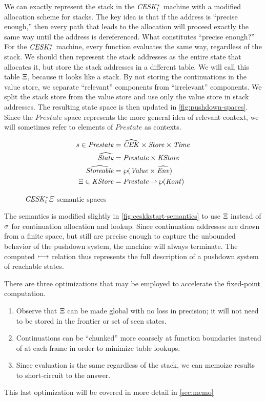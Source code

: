 We can exactly represent the stack in the $\mathit{CESK^*_t}$ machine with a modified allocation scheme for stacks.
%
The key idea is that if the address is ``precise enough,'' then every path that leads to the allocation will proceed exactly the same way until the address is dereferenced.
%
What constitutes ``precise enough?'' 
%
For the $\mathit{CESK^*_t}$ machine, every function evaluates the same way, regardless of the stack.
%
We should then represent the stack addresses as the entire state that allocates it, but store the stack addresses in a different table.
%
We will call this table $\Xi$, because it looks like a stack.
%
By not storing the continuations in the value store, we separate ``relevant'' components from ``irrelevant'' components.
%
We split the stack store from the value store and use only the value store in stack addresses.
%
The resulting state space is then updated in \autoref{fig:pushdown-spaces}.
%
Since the $\mathit{Prestate}$ space represents the more general idea of relevant context, we will sometimes refer to elements of $\mathit{Prestate}$ as contexts.

\begin{figure}
  \centering
  \begin{align*}
    s \in \mathit{Prestate} &= \widehat{\mathit{CEK}} \times \mathit{Store} \times \mathit{Time} \\
    \widehat{\mathit{State}} &= \mathit{Prestate} \times \mathit{KStore} \\
    \widehat{\mathit{Storeable}} &= \wp(\mathit{Value} \times \widehat{\mathit{Env}}) \\
    \Xi \in \mathit{KStore} &= \mathit{Prestate} \operatorname*{\rightharpoonup} \wp(\mathit{Kont})
  \end{align*}
  \caption{$\mathit{CESK^*_t\Xi}$ semantic spaces}
  \label{fig:pushdown-spaces}
\end{figure}

The semantics is modified slightly in \autoref{fig:ceskkstart-semantics} to use $\Xi$ instead of $\sigma$ for continuation allocation and lookup.
%
Since continuation addresses are drawn from a finite space, but still are precise enough to capture the unbounded behavior of the pushdown system, the machine will always terminate.
%
The computed $\longmapsto$ relation thus represents the full description of a pushdown system of reachable states.
\begin{theorem}[Correctness]
\end{theorem}

There are three optimizations that may be employed to accelerate the fixed-point computation.
\begin{enumerate}
\item{Observe that $\Xi$ can be made global with no loss in precision; it will not need to be stored in the frontier or set of seen states.}
\item{Continuations can be ``chunked'' more coarsely at function boundaries instead of at each frame in order to minimize table lookups.}
\item{Since evaluation is the same regardless of the stack, we can memoize results to short-circuit to the answer.}
\end{enumerate}
%
This last optimization will be covered in more detail in \autoref{sec:memo}


